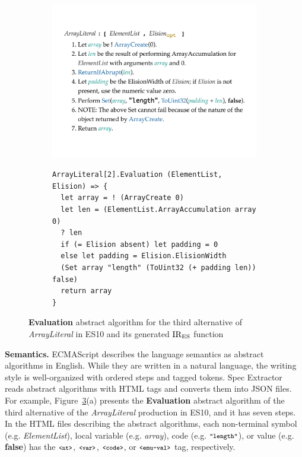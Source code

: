 \begin{figure}
  \centering
  \begin{subfigure}{0.43\textwidth}
    \includegraphics[width=\textwidth]{img/arrayliteral-eval.pdf}
    \label{fig:array-literal-eval-es}
  \end{subfigure}
  \qquad
  \begin{subfigure}{0.46\textwidth}
    \begin{lstlisting}[style=ires]
ArrayLiteral[2].Evaluation (ElementList, Elision) => {
  let array = ! (ArrayCreate 0)
  let len = (ElementList.ArrayAccumulation array 0)
  ? len
  if (= Elision absent) let padding = 0
  else let padding = Elision.ElisionWidth
  (Set array "length" (ToUint32 (+ padding len)) false)
  return array
}
    \end{lstlisting}
    \vspace*{-1em}
    \label{fig:array-literal-eval-ires}
  \end{subfigure}
  \vspace{-1em}
  \caption{\textbf{Evaluation} abstract algorithm for the third alternative of
    \textit{ArrayLiteral} in ES10 and its generated \( \text{IR}_\text{ES} \)
    function}
  \label{fig:array-literal-eval}
  \vspace{-1em}
\end{figure}

\textbf{Semantics.}
ECMAScript describes the language semantics as abstract algorithms in English.
While they are written in a natural language, the writing style is
well-organized with ordered steps and tagged tokens.  {\sf Spec Extractor}
reads abstract algorithms with HTML tags and converts them into JSON files.
For example, Figure~\ref{fig:array-literal-eval}(a) presents the
\textbf{Evaluation} abstract algorithm of the third alternative of the
\textit{ArrayLiteral} production in ES10, and it has seven steps.  In the HTML
files describing the abstract algorithms, each non-terminal symbol
(e.g. \textit{ElementList}), local variable (e.g. \textit{array}), code (e.g. \(
\texttt{\footnotesize"length"} \)), or value (e.g. \textbf{false}) has the \( \texttt{\footnotesize<nt>} \),
\( \texttt{\footnotesize<var>} \), \( \texttt{\footnotesize<code>} \), or \( \texttt{\footnotesize<emu-val>} \) tag,
respectively.

